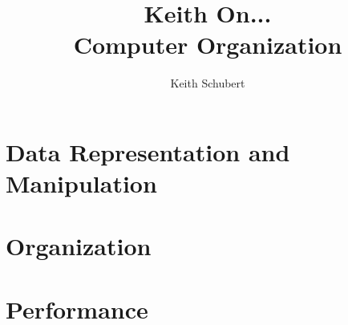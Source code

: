 \documentclass[]{book}
\title{
{\Large Keith On...} \\
{\huge Computer Organization}
}
\author{
  Keith Schubert%
}
\date{}
\begin{document}
\normalbaselineskip

\maketitle

\tableofcontents



%
%
%
%
%
%
%
%
%
%
%
%
\part{Data Representation and Manipulation}



\part{Organization}









\part{Performance}






\appendix


%
%
%
%
%
%




\end{document}
